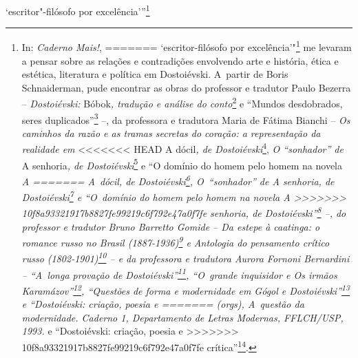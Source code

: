 `escritor"-filósofo por excelência'''\footnote{In: \emph{Caderno Mais!},
=======
`escritor-filósofo por excelência'"\footnote{In: \emph{Caderno Mais!},
>>>>>>> 10f8a93321917b8827fe99219c6f792e47a0f7fe
  Folha de São Paulo. São Paulo, 6 de maio de 2001.} me levaram a pensar
sobre as relações e contradições envolvendo arte e história, ética e
estética, literatura e política em Dostoiévski. A~partir de Boris
Schnaiderman, pude encontrar as obras do professor e tradutor Paulo
Bezerra -- \emph{Dostoiévski:} Bóbok\emph{, tradução e análise do
conto}\footnote{São Paulo: Editora 34, 2005.} e ``Mundos desdobrados,
seres duplicados''\footnote{In: \emph{Caderno de literatura e cultura
  russa: Dostoiévski}. São Paulo: Ateliê Cultural, 2008.} --, da
professora e tradutora Maria de Fátima Bianchi -- \emph{Os caminhos da
razão e as tramas secretas do coração: a representação da realidade em}
<<<<<<< HEAD
A dócil\emph{, de Dostoiévski}\footnote{Dissertação de mestrado,
  . São Paulo: 2001.}, \emph{O ``sonhador'' de} A
senhoria\emph{, de Dostoiévski}\footnote{Tese de doutorado, .
  São Paulo: 2006.} e ``O domínio do homem pelo homem na novela \emph{A
=======
A~dócil\emph{, de Dostoiévski}\footnote{Dissertação de mestrado,
  FFLCH-USP. São Paulo: 2001.}, \emph{O~``sonhador'' de} A
senhoria\emph{, de Dostoiévski}\footnote{Tese de doutorado, FFLCH-USP.
  São Paulo: 2006.} e ``O~domínio do homem pelo homem na novela \emph{A
>>>>>>> 10f8a93321917b8827fe99219c6f792e47a0f7fe
senhoria}, de Dostoiévski''\footnote{In: \emph{Revista de literatura e
  cultura russa.} Volume 2, número 2. São Paulo: 2013, pp. 35-54.} --,
do professor e tradutor Bruno Barretto Gomide -- \emph{Da estepe à
caatinga: o romance russo no Brasil (1887-1936)}\footnote{São Paulo:
  Edusp, 2011.} e \emph{Antologia do pensamento crítico russo
(1802-1901)}\footnote{São Paulo: Editora 34, 2013.} -- e da professora e
tradutora Aurora Fornoni Bernardini -- ``A~longa provação de
Dostoiévski''\footnote{Resenha da obra: Dostoiévski, Fiódor.
  \emph{Recordações da casa dos mortos.} São Paulo: Nova Alexandria,
  2006.}, ``O~grande inquisidor e \emph{Os irmãos Karamázov}''\footnote{In:
  Novinsky, A. W.; Carneiro, M. L. T. (Orgs.). \emph{Inquisição: ensaios
  sobre mentalidade, heresias e arte.} São Paulo: /Expressão e
  Cultura, 1992, pp. 682-691.}\emph{, ``}Questões de forma e modernidade
em Gógol e Dostoiévski''\footnote{In: Mutran, M. H. e Chiampi, I.
<<<<<<< HEAD
  (orgs), \emph{A questão da modernidade}. Caderno 1, Departamento de
  Letras Modernas, , 1993.} e ``Dostoiévski: criação, poesia e
=======
  (orgs), \emph{A~questão da modernidade}. Caderno 1, Departamento de
  Letras Modernas, FFLCH/USP, 1993.} e ``Dostoiévski: criação, poesia e
>>>>>>> 10f8a93321917b8827fe99219c6f792e47a0f7fe
crítica''\footnote{In: \emph{Caderno de literatura e cultura russa:
  Dostoiévski}. São Paulo: Ateliê Cultural, 2008.}.

}
